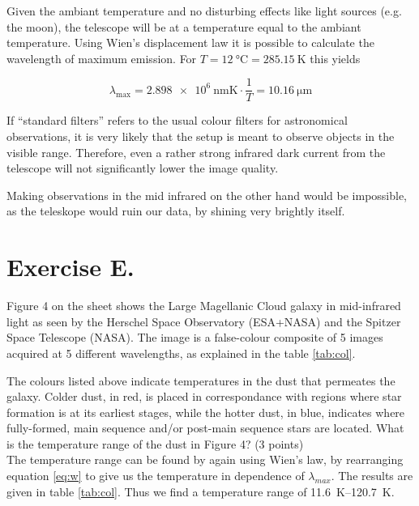 \documentclass[11pt,a4paper,twoside]{article}
\newcommand{\red}[1]{\textcolor{red}{#1}}
\begin{document}
Given the ambiant temperature and no disturbing effects like light sources
(e.g. the moon), the telescope will be at a temperature equal to the ambiant
temperature. Using Wien's displacement law it is possible to calculate the
wavelength of maximum emission. For $T = \SI{12}{\celsius} =
\SI{285.15}{\kelvin}$ this yields

\begin{equation}
 \lambda_{\text{max}} = \SI{2.898e6}{\nano\metre\kelvin} \cdot \frac{1}{T} = \SI{10.16}{\micro\metre}
\end{equation}

If ``standard filters'' refers to the usual colour filters for astronomical
observations, it is very likely that the setup is meant to observe objects in
the visible range. Therefore, even a rather strong infrared dark current from
the telescope will not significantly lower the image quality. 

Making observations in the mid infrared on the other hand would be impossible,
as the teleskope would ruin our data, by shining very brightly itself.


\section*{Exercise E.}

Figure 4 on the sheet shows the Large Magellanic Cloud galaxy in mid-infrared
light as seen by the Herschel Space Observatory (ESA+NASA) and the Spitzer
Space Telescope (NASA). The image is a false-colour composite of 5 images
acquired at 5 different wavelengths, as explained in the table \ref{tab:col}.


The colours listed above indicate temperatures in the dust that permeates the
galaxy.  Colder dust, in red, is placed in correspondance with regions where
star formation is at its earliest stages, while the hotter dust, in blue,
indicates where fully-formed, main sequence and/or post-main sequence stars are
located.  What is the temperature range of the dust in Figure 4? (3 points) \\

The temperature range can be found by again using Wien's law, by rearranging
equation \ref{eq:w} to give us the temperature in dependence of $\lambda_{max}$.
The results are given in table \ref{tab:col}. Thus we find a temperature range
of  \SIrange{11.6}{120.7}{\kelvin}.
\end{document}
